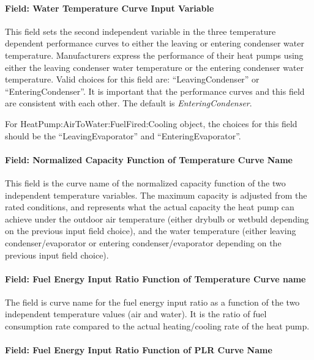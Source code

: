 \paragraph{Field: Water Temperature Curve Input Variable}

This field sets the second independent variable in the three temperature dependent performance curves to either the leaving or entering condenser water temperature. Manufacturers express the performance of their heat pumps using either the leaving condenser water temperature or the entering condenser water temperature. Valid choices for this field are: ``LeavingCondenser'' or ``EnteringCondenser''. It is important that the performance curves and this field are consistent with each other. The default is \emph{EnteringCondenser}.

For HeatPump:AirToWater:FuelFired:Cooling object, the choices for this field should be the ``LeavingEvaporator'' and ``EnteringEvaporator''.

\paragraph{Field: Normalized Capacity Function of Temperature Curve Name}

This field is the curve name of the normalized capacity function of the two independent temperature variables. The maximum capacity is adjusted from the rated conditions, and represents what the actual capacity the heat pump can achieve under the outdoor air temperature (either drybulb or wetbuld depending on the previous input field choice), and the water temperature (either leaving condenser/evaporator or entering condenser/evaporator depending on the previous input field choice).

\paragraph{Field: Fuel Energy Input Ratio Function of Temperature Curve name}

The field is curve name for the fuel energy input ratio as a function of the two independent temperature values (air and water). It is the ratio of fuel consumption rate compared to the actual heating/cooling rate of the heat pump.

\paragraph{Field: Fuel Energy Input Ratio Function of PLR Curve Name}

